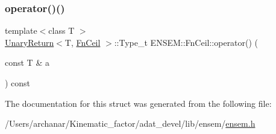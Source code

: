 \mbox{\label{structENSEM_1_1FnCeil_acaee8f3349fe23a961345ed93b8c7bc4}} 
\subsubsection{\texorpdfstring{operator()()}{operator()()}\hspace{0.1cm}{\footnotesize\ttfamily [2/2]}}
{\footnotesize\ttfamily template$<$class T $>$ \\
\mbox{\hyperlink{structENSEM_1_1UnaryReturn}{Unary\+Return}}$<$T, \mbox{\hyperlink{structENSEM_1_1FnCeil}{Fn\+Ceil}} $>$\+::Type\+\_\+t E\+N\+S\+E\+M\+::\+Fn\+Ceil\+::operator() (\begin{DoxyParamCaption}\item[{const T \&}]{a }\end{DoxyParamCaption}) const\hspace{0.3cm}{\ttfamily [inline]}}



The documentation for this struct was generated from the following file\+:\begin{DoxyCompactItemize}
\item 
/\+Users/archanar/\+Kinematic\+\_\+factor/adat\+\_\+devel/lib/ensem/\mbox{\hyperlink{lib_2ensem_2ensem_8h}{ensem.\+h}}\end{DoxyCompactItemize}
